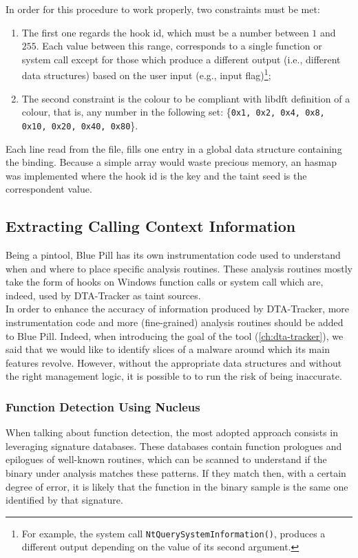 \documentclass[LaM,binding=0.6cm]{sapthesis}
\begin{document}
In order for this procedure to work properly, two constraints must be met:
\begin{enumerate}
\item The first one regards the hook id, which must be a number between $1$ and $255$. Each value between this range, corresponds to a single function or system call except for those which produce a different output (i.e., different data structures) based on the user input (e.g., input flag)\footnote{For example, the system call \texttt{NtQuerySystemInformation()}, produces a different output depending on the value of its second argument.};
\item The second constraint is the colour to be compliant with libdft definition of a colour, that is, any number in the following set: \{\texttt{0x1, 0x2, 0x4, 0x8, 0x10, 0x20, 0x40, 0x80}\}.
\end{enumerate}
Each line read from the file, fills one entry in a global data structure containing the binding. Because a simple array would waste precious memory, an hasmap was implemented where the hook id is the key and the taint seed is the correspondent value.

\subsection{Extracting Calling Context Information}
Being a pintool, Blue Pill has its own instrumentation code used to understand when and where to place specific analysis routines. These analysis routines mostly take the form of hooks on Windows function calls or system call which are, indeed, used by DTA-Tracker as taint sources.\\

In order to enhance the accuracy of information produced by DTA-Tracker, more instrumentation code and more (fine-grained) analysis routines should be added to Blue Pill. Indeed, when introducing the goal of the tool (\autoref{ch:dta-tracker}), we said that we would like to identify slices of a malware around which its main features revolve. However, without the appropriate data structures and without the right management logic, it is possible to to run the risk of being inaccurate.

\subsubsection{Function Detection Using Nucleus\cite{andriesse2017compiler}}
When talking about function detection, the most adopted approach consists in leveraging signature databases. These databases contain function prologues and epilogues of well-known routines, which can be scanned to understand if the binary under analysis matches these patterns. If they match then, with a certain degree of error, it is likely that the function in the binary sample is the same one identified by that signature.
\end{document}
